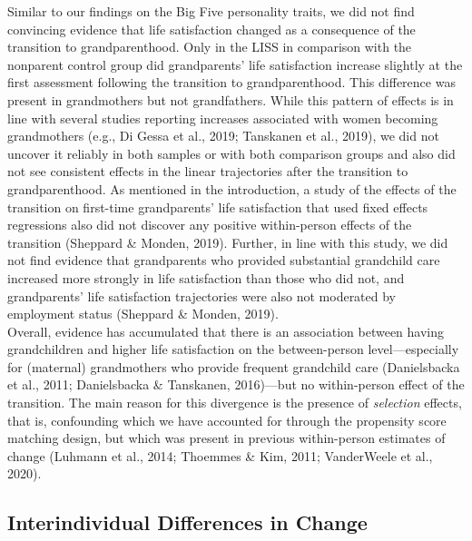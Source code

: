 \documentclass[
  english,
  man,floatsintext]{apa7}
\begin{document}
Similar to our findings on the Big Five personality traits, we did not find convincing evidence that life satisfaction changed as a consequence of the transition to grandparenthood. Only in the LISS in comparison with the nonparent control group did grandparents' life satisfaction increase slightly at the first assessment following the transition to grandparenthood. This difference was present in grandmothers but not grandfathers. While this pattern of effects is in line with several studies reporting increases associated with women becoming grandmothers (e.g., Di Gessa et al., 2019; Tanskanen et al., 2019), we did not uncover it reliably in both samples or with both comparison groups and also did not see consistent effects in the linear trajectories after the transition to grandparenthood. As mentioned in the introduction, a study of the effects of the transition on first-time grandparents' life satisfaction that used fixed effects regressions also did not discover any positive within-person effects of the transition (Sheppard \& Monden, 2019). Further, in line with this study, we did not find evidence that grandparents who provided substantial grandchild care increased more strongly in life satisfaction than those who did not, and grandparents' life satisfaction trajectories were also not moderated by employment status (Sheppard \& Monden, 2019).\\
Overall, evidence has accumulated that there is an association between having grandchildren and higher life satisfaction on the between-person level---especially for (maternal) grandmothers who provide frequent grandchild care (Danielsbacka et al., 2011; Danielsbacka \& Tanskanen, 2016)---but no within-person effect of the transition. The main reason for this divergence is the presence of \emph{selection} effects, that is, confounding which we have accounted for through the propensity score matching design, but which was present in previous within-person estimates of change (Luhmann et al., 2014; Thoemmes \& Kim, 2011; VanderWeele et al., 2020).

\hypertarget{interindividual-differences-in-change-1}{%
\subsection{Interindividual Differences in Change}\label{interindividual-differences-in-change-1}}
\end{document}
